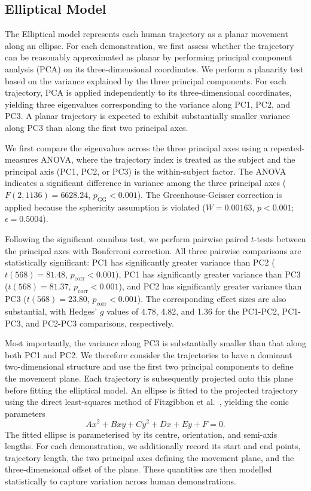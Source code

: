 \documentclass[journal]{IEEEtran}
\begin{document}
\subsection{Elliptical Model}

The Elliptical model represents each human trajectory as a planar movement along an ellipse. For each demonstration, we first assess whether the trajectory can be reasonably approximated as planar by performing principal component analysis (PCA) on its three-dimensional coordinates. We perform a planarity test based on the variance explained by the three principal components. For each trajectory, PCA is applied independently to its three-dimensional coordinates, yielding three eigenvalues corresponding to the variance along PC1, PC2, and PC3. A planar trajectory is expected to exhibit substantially smaller variance along PC3 than along the first two principal axes.

We first compare the eigenvalues across the three principal axes using a repeated-measures ANOVA, where the trajectory index is treated as the subject and the principal axis (PC1, PC2, or PC3) is the within-subject factor. The ANOVA indicates a significant difference in variance among the three principal axes ($F(2,1136)=6628.24$, $p_{\mathrm{GG}}<0.001$). The Greenhouse-Geisser correction is applied because the sphericity assumption is violated ($W=0.00163$, $p<0.001$; $\epsilon=0.5004$).

Following the significant omnibus test, we perform pairwise paired $t$-tests between the principal axes with Bonferroni correction. All three pairwise comparisons are statistically significant: PC1 has significantly greater variance than PC2 ($t(568)=81.48$, $p_{\mathrm{corr}}<0.001$), PC1 has significantly greater variance than PC3 ($t(568)=81.37$, $p_{\mathrm{corr}}<0.001$), and PC2 has significantly greater variance than PC3 ($t(568)=23.80$, $p_{\mathrm{corr}}<0.001$). The corresponding effect sizes are also substantial, with Hedges' $g$ values of 4.78, 4.82, and 1.36 for the PC1-PC2, PC1-PC3, and PC2-PC3 comparisons, respectively.

Most importantly, the variance along PC3 is substantially smaller than that along both PC1 and PC2. We therefore consider the trajectories to have a dominant two-dimensional structure and use the first two principal components to define the movement plane. Each trajectory is subsequently projected onto this plane before fitting the elliptical model. An ellipse is fitted to the projected trajectory using the direct least-squares method of Fitzgibbon et al.~\cite{fitzgibbon_DirectLeastSquare_1999}, yielding the conic parameters
\begin{equation}
Ax^2 + Bxy + Cy^2 + Dx + Ey + F = 0.
\end{equation}
The fitted ellipse is parameterised by its centre, orientation, and semi-axis lengths. For each demonstration, we additionally record its start and end points, trajectory length, the two principal axes defining the movement plane, and the three-dimensional offset of the plane. These quantities are then modelled statistically to capture variation across human demonstrations.
\end{document}
